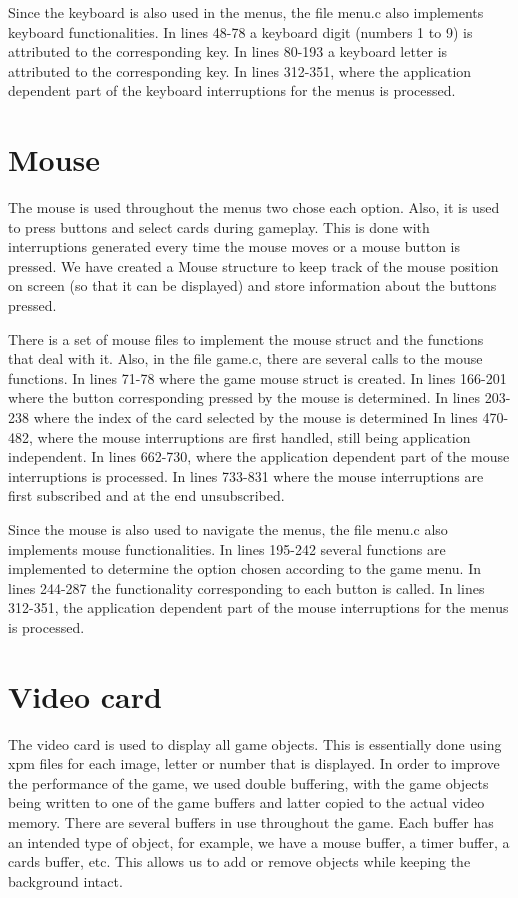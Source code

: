 \documentclass[11pt,a4paper,reqno]{report}
\numberwithin{equation}{section}
\begin{document}
Since the keyboard is also used in the menus, the file menu.c also implements keyboard functionalities. In lines 48-78 a keyboard digit (numbers 1 to 9) is attributed to the corresponding key. In lines 80-193 a keyboard letter is attributed to the corresponding key. In lines 312-351, where the application dependent part of the keyboard interruptions for the menus is processed. 

\section{Mouse}

The mouse is used throughout the menus two chose each option. Also, it is used to press buttons and select cards during gameplay. This is done with interruptions generated every time the mouse moves or a mouse button is pressed. We have created a Mouse structure to keep track of the mouse position on screen (so that it can be displayed) and store information about the buttons pressed.

There is a set of mouse files to implement the mouse struct and the functions that deal with it. Also, in the file game.c, there are several calls to the mouse functions. In lines 71-78 where the game mouse struct is created. In lines 166-201 where the button corresponding pressed by the mouse is determined. In lines 203-238 where the index of the card selected by the mouse is determined In lines 470-482, where the mouse interruptions are first handled, still being application independent. In lines 662-730, where the application dependent part of the mouse interruptions is processed. In lines 733-831 where the mouse interruptions are first subscribed and at the end unsubscribed.

Since the mouse is also used to navigate the menus, the file menu.c also implements mouse functionalities. In lines 195-242 several functions are implemented to determine the option chosen according to the game menu. In lines 244-287 the functionality corresponding to each button is called. In lines 312-351, the application dependent part of the mouse interruptions for the menus is processed. 

\section{Video card}

The video card is used to display all game objects. This is essentially done using xpm files for each image, letter or number that is displayed. In order to improve the performance of the game, we used double buffering, with the game objects being written to one of the game buffers and latter copied to the actual video memory. There are several buffers in use throughout the game. Each buffer has an intended type of object, for example, we have a mouse buffer, a timer buffer, a cards buffer, etc. This allows us to add or remove objects while keeping the background intact. 
\end{document}
